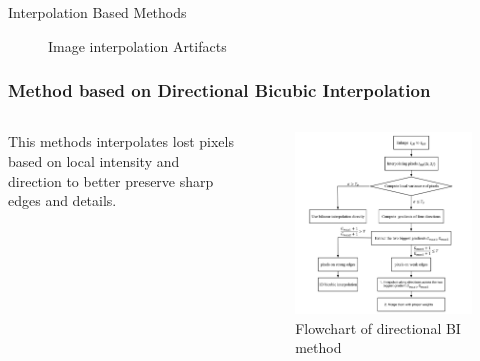 \documentclass[11pt, presentation]{beamer}
\begin{document}
\begin{section}{Interpolation Based Methods}
\begin{frame}
\begin{figure}
                \caption{Image interpolation Artifacts~\cite{camii}}
                \label{fig:artifacts}
            \end{figure}
        \end{frame}
        \begin{frame}
            \frametitle{Method based on Directional Bicubic Interpolation}
            \begin{columns}
                \begin{column}{0.5\textwidth}
                    This methods interpolates
                    lost pixels based on local intensity and direction to better preserve
                    sharp edges and details.
                \end{column}
                \begin{column}{0.5\textwidth}
                    \begin{figure}
                        \includegraphics[width=\textwidth]{images/bi-method}
                        \caption{Flowchart of directional BI method}
                        \label{fig:dbi-method}
                    \end{figure}
                \end{column}
            \end{columns}
        \end{frame}

\end{section}
\end{document}
